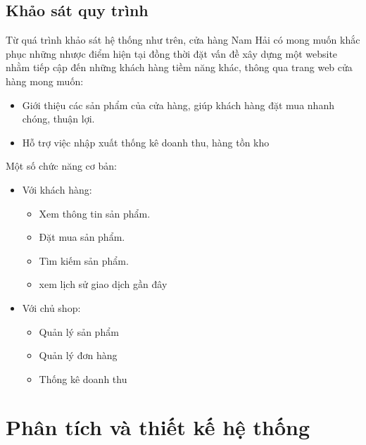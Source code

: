 \subsection{Khảo sát quy trình}
Từ quá trình khảo sát hệ thống như trên, cửa hàng Nam Hải có mong muốn khắc phục những nhược điểm hiện tại đồng thời đặt vấn đề xây dựng một website nhằm tiếp cập đến những khách hàng tiềm năng khác, thông qua trang web cửa hàng mong muốn:
\begin{itemize}
	\item Giới thiệu các sản phẩm của cửa hàng, giúp khách hàng đặt mua nhanh chóng, thuận lợi.
	\item Hỗ trợ việc nhập xuất thống kê doanh thu, hàng tồn kho
\end{itemize}\par
Một số chức năng cơ bản:
\begin{itemize}
	\item Với khách hàng:
	      \begin{itemize}
		      \item Xem thông tin sản phẩm.
		      \item Đặt mua sản phẩm.
		      \item Tìm kiếm sản phẩm.
		      \item xem lịch sử giao dịch gần đây
	      \end{itemize}
	\item Với chủ shop:
	      \begin{itemize}
		      \item Quản lý sản phẩm
		      \item Quản lý đơn hàng
		      \item Thống kê doanh thu
	      \end{itemize}
\end{itemize}
\newpage
\section{Phân tích và thiết kế hệ thống}
